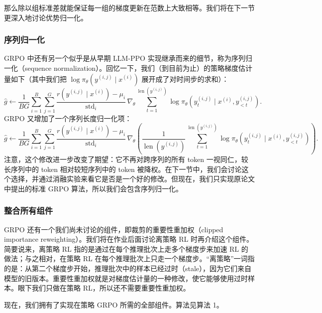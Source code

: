 那么除以组标准差就能保证每一组的梯度更新在范数上大致相等。我们将在下一节更深入地讨论优势归一化。

\subsubsection{序列归一化}

GRPO 中还有另一个似乎是从早期 LLM-PPO 实现继承而来的细节，称为序列归一化（sequence normalization）。回忆一下，我们（到目前为止）的策略梯度估计量如下（其中我们把 $\log \pi_\theta(y^{(i,j)} \mid x^{(i)})$ 展开成了对时间步的求和）：
\begin{equation}
\hat{g} \leftarrow \frac{1}{BG}\sum_{i=1}^{B}\sum_{j=1}^{G} \frac{r(y^{(i,j)} \mid x^{(i)}) - \mu_i}{\operatorname{std}_i}\, \nabla_\theta \sum_{t=1}^{\operatorname{len}(y^{(i,j)})} \log \pi_\theta\!\left(y_t^{(i,j)} \mid x^{(i)}, y_{<t}^{(i,j)}\right).
\end{equation}
GRPO 又增加了一个序列长度归一化项：
\begin{equation}
\hat{g} \leftarrow \frac{1}{BG}\sum_{i=1}^{B}\sum_{j=1}^{G} \frac{r(y^{(i,j)} \mid x^{(i)}) - \mu_i}{\operatorname{std}_i}\, \nabla_\theta\!\left(\frac{1}{\operatorname{len}(y^{(i,j)})}\sum_{t=1}^{\operatorname{len}(y^{(i,j)})} \log \pi_\theta\!\left(y_t^{(i,j)} \mid x^{(i)}, y_{<t}^{(i,j)}\right)\right).
\end{equation}
注意，这个修改进一步改变了期望：它不再对跨序列的所有 token 一视同仁，较长序列中的 token 相对较短序列中的 token 被降权。在下一节中，我们会讨论这个选择，并通过消融实验来看它是否是一个好的修改。但现在，我们只实现原论文中提出的标准 GRPO 算法，所以我们会包含序列归一化。

\subsubsection{整合所有组件}

GRPO 还有一个我们尚未讨论的组件，即裁剪的重要性重加权（clipped importance reweighting）。我们将在作业后面讨论离策略 RL 时再介绍这个组件。简要说来，离策略 RL 指的是通过在每个推理批次上走多个梯度步来加速 RL 的做法；与之相对，在策略 RL 在每个推理批次上只走一个梯度步。“离策略”一词指的是：从第二个梯度步开始，推理批次中的样本已经过时（stale），因为它们来自模型的旧版本。重要性重加权就是对梯度估计量的一种修改，使它能够使用过时样本。眼下我们只做在策略 RL，所以还不需要重要性重加权。

现在，我们拥有了实现在策略 GRPO 所需的全部组件。算法见算法 1。

